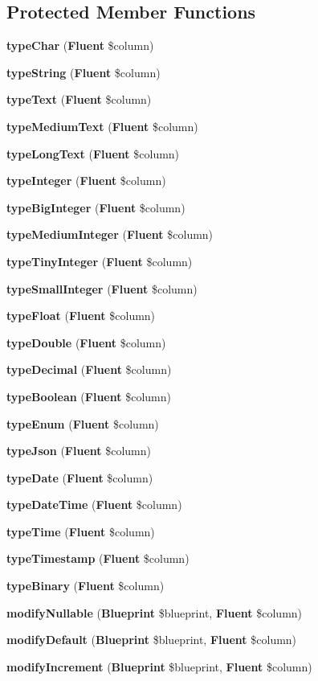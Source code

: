 \subsection*{Protected Member Functions}
\begin{DoxyCompactItemize}
\item 
{\bf type\+Char} ({\bf Fluent} \$column)
\item 
{\bf type\+String} ({\bf Fluent} \$column)
\item 
{\bf type\+Text} ({\bf Fluent} \$column)
\item 
{\bf type\+Medium\+Text} ({\bf Fluent} \$column)
\item 
{\bf type\+Long\+Text} ({\bf Fluent} \$column)
\item 
{\bf type\+Integer} ({\bf Fluent} \$column)
\item 
{\bf type\+Big\+Integer} ({\bf Fluent} \$column)
\item 
{\bf type\+Medium\+Integer} ({\bf Fluent} \$column)
\item 
{\bf type\+Tiny\+Integer} ({\bf Fluent} \$column)
\item 
{\bf type\+Small\+Integer} ({\bf Fluent} \$column)
\item 
{\bf type\+Float} ({\bf Fluent} \$column)
\item 
{\bf type\+Double} ({\bf Fluent} \$column)
\item 
{\bf type\+Decimal} ({\bf Fluent} \$column)
\item 
{\bf type\+Boolean} ({\bf Fluent} \$column)
\item 
{\bf type\+Enum} ({\bf Fluent} \$column)
\item 
{\bf type\+Json} ({\bf Fluent} \$column)
\item 
{\bf type\+Date} ({\bf Fluent} \$column)
\item 
{\bf type\+Date\+Time} ({\bf Fluent} \$column)
\item 
{\bf type\+Time} ({\bf Fluent} \$column)
\item 
{\bf type\+Timestamp} ({\bf Fluent} \$column)
\item 
{\bf type\+Binary} ({\bf Fluent} \$column)
\item 
{\bf modify\+Nullable} ({\bf Blueprint} \$blueprint, {\bf Fluent} \$column)
\item 
{\bf modify\+Default} ({\bf Blueprint} \$blueprint, {\bf Fluent} \$column)
\item 
{\bf modify\+Increment} ({\bf Blueprint} \$blueprint, {\bf Fluent} \$column)
\end{DoxyCompactItemize}
